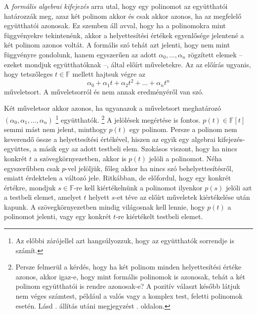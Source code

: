 \documentclass[9pt, a4paper, showtrims]{memoir}
\theoremstyle{plain}
\theoremstyle{remark}
\theoremstyle{definition}
\begin{document}
A \emph{formális algebrai kifejezés} arra utal,
hogy egy polinomot az együtthatói határozzák meg,
azaz két polinom akkor és csak akkor azonos,
ha az megfelelő együtthatói azonosak.
Ez szemben áll avval, hogy ha a polinomokra mint függvényekre tekintenénk,
akkor a helyettesítési értékek egyenlősége jelentené a két polinom azonos voltát.
A formális szó tehát azt jelenti, hogy nem mint függvényre gondolunk,
hanem egyszerűen az adott $\alpha_0,\ldots,\alpha_n$ rögzített elemek -- ezeket mondjuk együtthatóknak --,
által előírt műveletekre.
Az az előírás ugyanis, hogy tetszőleges $t\in\mathbb{F}$ mellett hajtsuk végre az
\[
	\alpha_0+\alpha_1t+\alpha_2t^2+\ldots+\alpha_nt^n
\]
műveletsort.
A műveletsorról és nem annak eredményéről van szó.


Két műveletsor akkor azonos, ha ugyanazok a műveletsort meghatározó
$\left( \alpha_0,\alpha_1,\ldots,\alpha_n \right)$%
\footnote{Az előbbi zárójellel azt hangsúlyozzuk, hogy az együtthatók sorrendje is számít.}
együtthatók.%
\footnote{Persze felmerül a kérdés,
	hogy ha két polinom minden helyettesítési értéke azonos,
	akkor igaz-e,
	hogy mint formális polinomok is azonosak,
	tehát a két polinom együtthatói is rendre azonosak-e?
	A pozitív választ később látjuk nem véges számtest, például a valós vagy a komplex test, feletti polinomok esetén.
	Lásd . állítás utáni megjegyzést . oldalon.%
}
A jelölések megértése is fontos.
$p\left( t \right)\in\mathbb{F}\left[ t \right]$ semmi mást nem jelent,
minthogy $p\left( t \right)$ egy polinom.
Persze a polinom nem keverendő össze a helyettesítési értékével,
hiszen az egyik egy algebrai kifejezés-együttes, a másik egy az adott testbeli elem.
Szokásos viszont, hogy ha nincs konkrét $t$ a szövegkörnyezetben, akkor is $p\left( t \right)$ jelöli a polinomot.
Néha egyszerűbben csak $p$-vel jelöljük, főleg akkor ha nincs szó behelyettesítésről,
emiatt érdektelen a változó jele.
Ritkábban, de előfordul, hogy egy konkrét értékre, mondjuk $s\in\mathbb{F}$-re kell kiértékelnünk a polinomot ilyenkor $p\left( s \right)$ jelöli azt a testbeli elemet,
amelyet $t$ helyett $s$-et téve az előírt műveletek kiértékelése után kapunk.
A szövegkörnyezetben mindig világosnak kell lennie, hogy $p\left( t \right)$ a polinomot jelenti,
vagy egy konkrét $t$-re kiértékelt testbeli elemet.
\end{document}
